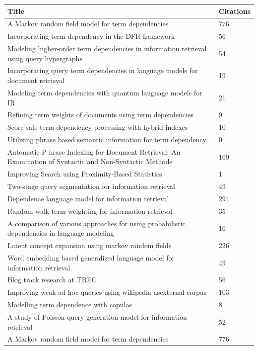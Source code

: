 \documentclass[letterpaper,11pt]{article}
\begin{document}
\begin{center}
\begin{longtable}{|*2{p{3.5cm}| }}
\hline
\textbf{Title} & \textbf{Citations} \\ \hline 
A Markov random field model for term dependencies & 776 \\ \hline
Incorporating term dependency in the DFR framework & 56 \\ \hline
Modeling higher-order term dependencies in information retrieval using query hypergraphs & 54 \\ \hline
Incorporating query term dependencies in language models for document retrieval & 19 \\ \hline
Modeling term dependencies with quantum language models for IR & 21 \\ \hline
Refining term weights of documents using term dependencies & 9 \\ \hline
Score-safe term-dependency processing with hybrid indexes & 10 \\ \hline
Utilizing phrase based semantic information for term dependency & 0 \\ \hline
Automatic P hrase Indexing for Document Retrieval: An Examination of Syntactic and Non-Syntactic Methods & 169 \\ \hline
Improving Search using Proximity-Based Statistics & 1 \\ \hline
Two-stage query segmentation for information retrieval & 49 \\ \hline
Dependence language model for information retrieval & 294 \\ \hline
Random walk term weighting for information retrieval & 35 \\ \hline
A comparison of various approaches for using probabilistic dependencies in language modeling & 16 \\ \hline
Latent concept expansion using markov random fields & 226 \\ \hline
Word embedding based generalized language model for information retrieval & 49 \\ \hline
Blog track research at TREC & 56 \\ \hline
Improving weak ad-hoc queries using wikipedia asexternal corpus & 103 \\ \hline
Modelling term dependence with copulas & 8 \\ \hline
A study of Poisson query generation model for information retrieval & 52 \\ \hline
A Markov random field model for term dependencies & 776 \\ \hline

\end{longtable}
\end{center}
\end{document}

